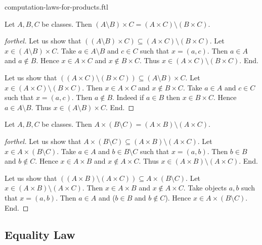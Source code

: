 \documentclass{naproche-library}
\begin{document}
\begin{smodule}{computation-laws-for-products.ftl}
  \begin{proposition}[forthel,id=FOUNDATIONS_05_6495329908162560,printid]
    Let $A, B, C$ be classes.
    Then $(A \setminus B) \times C = (A \times C) \setminus (B \times C)$.
  \end{proposition}
  \begin{proof}[forthel]
    Let us show that $((A \setminus B) \times C) \subseteq (A \times C) \setminus (B \times C).$ %
      Let $x \in (A \setminus B) \times C$.
      Take $a \in A \setminus B$ and $c \in C$ such that $x = (a, c)$.
      Then $a \in A$ and $a \notin B$.
      Hence $x \in A \times C$ and $x \notin B \times C$.
      Thus $x \in (A \times C) \setminus (B \times C)$.
    End.

    Let us show that $((A \times C) \setminus (B \times C)) \subseteq (A \setminus B) \times C$. %
      Let $x \in (A \times C) \setminus (B \times C)$.
      Then $x \in A \times C$ and $x \notin B \times C$.
      Take $a \in A$ and $c \in C$ such that $x = (a, c)$.
      Then $a \notin B$.
      Indeed if $a \in B$ then $x \in B \times C$.
      Hence $a \in A \setminus B$.
      Thus $x \in (A \setminus B) \times C$.
    End.
  \end{proof}

  \begin{proposition}[forthel,id=FOUNDATIONS_05_3195639422779392,printid]
    Let $A, B, C$ be classes.
    Then $A \times (B \setminus C) = (A \times B) \setminus (A \times C)$.
  \end{proposition}
  \begin{proof}[forthel]
    Let us show that $A \times (B \setminus C) \subseteq (A \times B) \setminus (A \times C)$.
      Let $x \in A \times (B \setminus C)$.
      Take $a \in A$ and $b \in B \setminus C$ such that $x = (a, b)$.
      Then $b \in B$ and $b \notin C$.
      Hence $x \in A \times B$ and $x \notin A \times C$.
      Thus $x \in (A \times B) \setminus (A \times C)$.
    End.

    Let us show that $((A \times B) \setminus (A \times C)) \subseteq A \times (B \setminus C)$. %
      Let $x \in (A \times B) \setminus (A \times C)$.
      Then $x \in A \times B$ and $x \notin A \times C$.
      Take objects $a, b$ such that $x = (a, b)$.
      Then $a \in A$ and ($b \in B$ and $b \notin C$).
      Hence $x \in A \times (B \setminus C)$.
    End.
  \end{proof}


  \subsection*{Equality Law}


\end{smodule}
\end{document}
